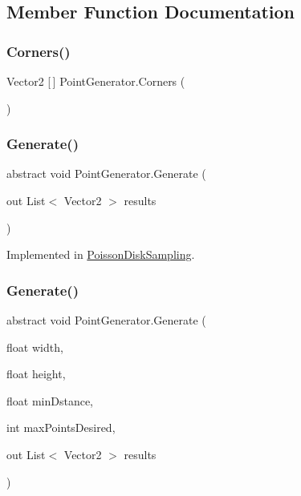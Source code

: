 \subsection{Member Function Documentation}
\mbox{\label{class_point_generator_a94c7b1d2e704fedde36309423cc0c609}} 
\subsubsection{\texorpdfstring{Corners()}{Corners()}}
{\footnotesize\ttfamily Vector2 \mbox{[}$\,$\mbox{]} Point\+Generator.\+Corners (\begin{DoxyParamCaption}{ }\end{DoxyParamCaption})}

\mbox{\label{class_point_generator_aa952bfb78a0b3d97db614f9f8d062747}} 
\subsubsection{\texorpdfstring{Generate()}{Generate()}\hspace{0.1cm}{\footnotesize\ttfamily [1/2]}}
{\footnotesize\ttfamily abstract void Point\+Generator.\+Generate (\begin{DoxyParamCaption}\item[{out List$<$ Vector2 $>$}]{results }\end{DoxyParamCaption})\hspace{0.3cm}{\ttfamily [pure virtual]}}



Implemented in \mbox{\hyperlink{class_poisson_disk_sampling_a93700de987a5b4bf64da7cd0db070534}{Poisson\+Disk\+Sampling}}.

\mbox{\label{class_point_generator_a9552a67546e0f4a0d96cd300c656c94e}} 
\subsubsection{\texorpdfstring{Generate()}{Generate()}\hspace{0.1cm}{\footnotesize\ttfamily [2/2]}}
{\footnotesize\ttfamily abstract void Point\+Generator.\+Generate (\begin{DoxyParamCaption}\item[{float}]{width,  }\item[{float}]{height,  }\item[{float}]{min\+Dstance,  }\item[{int}]{max\+Points\+Desired,  }\item[{out List$<$ Vector2 $>$}]{results }\end{DoxyParamCaption})\hspace{0.3cm}{\ttfamily [pure virtual]}}




